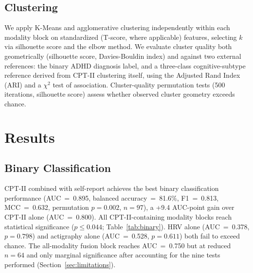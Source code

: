 \documentclass[11pt]{article}
\begin{document}
\subsection{Clustering}

We apply K-Means and agglomerative clustering independently within each modality block on standardized (T-score, where applicable) features, selecting $k$ via silhouette score and the elbow method. We evaluate cluster quality both geometrically (silhouette score, Davies-Bouldin index) and against two external references: the binary ADHD diagnosis label, and a three-class cognitive-subtype reference derived from CPT-II clustering itself, using the Adjusted Rand Index (ARI) and a $\chi^2$ test of association. Cluster-quality permutation tests (500 iterations, silhouette score) assess whether observed cluster geometry exceeds chance.

\section{Results}

\subsection{Binary Classification}

CPT-II combined with self-report achieves the best binary classification performance (AUC~=~0.895, balanced accuracy~=~81.6\%, F1~=~0.813, MCC~=~0.632, permutation $p=0.002$, $n=97$), a +9.4 AUC-point gain over CPT-II alone (AUC~=~0.800). All CPT-II-containing modality blocks reach statistical significance ($p\le0.044$; Table~\ref{tab:binary}). HRV alone (AUC~=~0.378, $p=0.798$) and actigraphy alone (AUC~=~0.528, $p=0.611$) both fail to exceed chance. The all-modality fusion block reaches AUC~=~0.750 but at reduced $n=64$ and only marginal significance after accounting for the nine tests performed (Section~\ref{sec:limitations}).
\end{document}
